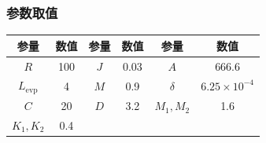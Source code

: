 \documentclass[aspectratio=169, 12pt, utf8, mathserif]{ctexbeamer} %
\begin{document}
\begin{frame}
	\frametitle{参数取值}
	\begin{center}
		\begin{tabular}{cccccc}
			\toprule
			参量 & 数值 & 参量 & 数值 & 参量 & 数值 \\
			\midrule
			\(R\) & 100 & \(J\) & 0.03 & \(A\) & 666.6 \\
			\(L_{\mathrm{evp}}\) & 4 & \(M\) & 0.9 & \(\delta\) & \(6.25\times10^{-4}\) \\
			\(C\) & 20 & \(D\) & 3.2 & \(M_{1},M_{2}\) & 1.6 \\
			\(K_{1},K_{2}\) & 0.4 \\
			\bottomrule
		\end{tabular}
	\end{center}
\end{frame}
	
\end{document}
